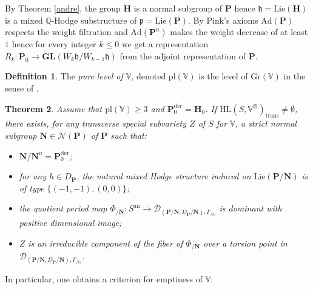 \documentclass[10pt]{article}
\numberwithin{equation}{subsection}
\theoremstyle{plain}
\newtheorem{theorem}{Theorem}[section]
\theoremstyle{definition}
\newtheorem{definition}[theorem]{Definition}
\theoremstyle{remark}
\newcommand{\lie}{\mathrm{Lie}}
\newcommand{\N}{\mathbb N}
\newcommand{\Z}{\mathbb Z}
\newcommand{\Q}{\mathbb Q}
\newcommand{\V}{\mathbb V}
\newcommand{\pp}{\mathbf P}
\newcommand{\mon}{\mathbf H}
\newcommand{\NN}{\mathbf N}
\newcommand{\HL}{\mathrm{HL}(S, \V^\otimes)}
\newcommand{\an}{\mathrm{an}}
\newcommand{\gr}{\mathrm{Gr}}
\newcommand{\gl}{\mathbf{GL}}
\newcommand{\para}{\mathfrak{p}}
\newcommand{\ort}{\mathfrak{h}}
\newcommand{\Ad}{\mathrm{Ad}}
\newcommand{\period}{\mathscr{D}}
\newcommand{\der}{\mathrm{der}}
\newcommand{\trans}{\mathrm{trans}}
\newcommand{\Np}{\mathcal{N}(\pp)}
\newcommand{\norma}{\mathfrak{n}}
\begin{document}
By Theorem \ref{andre}, the group $\mon$ is a normal subgroup of $\pp$ hence $\ort = \lie(\mon)$ is a mixed $\Q$-Hodge substructure of $\para = \lie(\pp)$. By Pink's axioms $\Ad(\pp)$ respects the weight filtration and $\Ad(\pp^u)$ makes the weight decrease of at least $1$ hence for every integer $k \leqslant 0$ we get a representation $R_k : \pp_0 \rightarrow \gl(W_k\ort / W_{k-1} \ort)$ from the adjoint representation of $\pp$.
\begin{definition}
The \textit{pure level of $\V$}, denoted $\mathrm{pl}(\V)$ is the level of $\gr(\V)$ in the sense of \cite[Def. 4.15]{bku}.
\end{definition}
\begin{theorem}\label{alternativempty}
Assume that $\mathrm{pl}(\V) \geqslant 3$ and $\pp_0^\der = \mon_0$. If $\HL_\trans \neq \emptyset$, there exists, for any transverse special subvariety $Z$ of $S$ for $\V$, a strict normal subgroup $\NN \in \Np$ of $\pp$ such that:
\begin{itemize}
\item $\NN/\NN^u = \pp_0^\der$;
\item for any $h \in D_\pp$, the natural mixed Hodge structure induced on $\lie(\pp/\NN)$ is of type $\{(-1,-1), (0,0)\}$;
\item the quotient period map $\Phi_{/\NN} : S^\an \rightarrow \period_{(\pp/\NN,D_\pp/\NN), \Gamma_{/\N}}$ is dominant with positive dimensional image;
\item $Z$ is an irreducible component of the fiber of $\Phi_{/\NN}$ over a torsion point in $\period_{(\pp/\NN,D_\pp/\NN), \Gamma_{/\N}}$.
\end{itemize}
\end{theorem}
In particular, one obtains a criterion for emptiness of $\V$:
\end{document}
